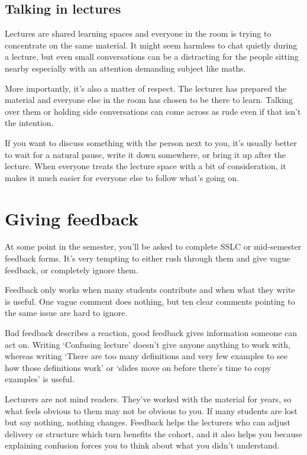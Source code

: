 \subsection{Talking in lectures}

Lectures are shared learning spaces and everyone in the room is trying to concentrate on the same material. It might seem harmless to chat quietly during a lecture, but even small conversations can be a distracting for the people sitting nearby especially with an attention demanding subject like maths. 

More importantly, it's also a matter of respect. The lecturer has prepared the material and everyone else in the room has chosen to be there to learn. Talking over them or holding side conversations can come across as rude even if that isn't the intention. 

If you want to discuss something with the person next to you, it's usually better to wait for a natural pause, write it down somewhere, or bring it up after the lecture. When everyone treats the lecture space with a bit of consideration, it makes it much easier for everyone else to follow what's going on. 


\section{Giving feedback}


At some point in the semester, you’ll be asked to complete SSLC or mid-semester feedback forms. It's very tempting to either rush through them and give vague feedback, or completely ignore them. 

Feedback only works when many students contribute and when what they write is useful. One vague comment does nothing, but ten clear comments pointing to the same issue are hard to ignore. 

Bad feedback describes a reaction, good feedback gives information someone can act on. Writing `Confusing lecture' doesn't give anyone anything to work with, whereas writing `There are too many definitions and very few examples to see how those definitions work' or `slides move on before there's time to copy examples' is useful. 

Lecturers are not mind readers. They’ve worked with the material for years, so what feels obvious to them may not be obvious to you. If many students are lost but say nothing, nothing changes. Feedback helps the lecturers who can adjust delivery or structure which turn benefits the cohort, and it also helps you because explaining confusion forces you to think about what you didn’t understand. 

